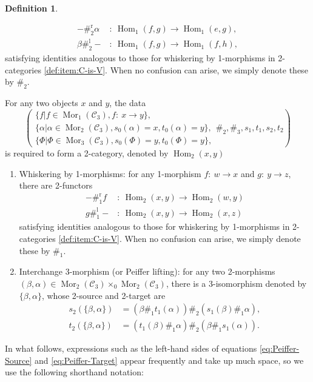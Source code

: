 \documentclass[11pt, reqno]{amsart} %
\newcommand{\mor}{{\mathop{\mathrm{Mor}}}}
\newcommand{\Hom}{{\mathop{\mathrm{Hom}}}}
\newcommand{\cC}{{\mathcal{C}}}
\theoremstyle{definition}
\newtheorem{definition}[theorem]{Definition}
\theoremstyle{remark}
\numberwithin{equation}{section}
\begin{document}
\begin{definition}
\begin{enumerate}
\begin{align}
    -\#_2^{\text{r}}\alpha&:~\Hom_1(f,g)\to \Hom_1(e,g), \\ 
    \nonumber
    \beta\#_2^{\text{l}}-&:~\Hom_1(f,g)\to \Hom_1(f,h),
  \end{align}
  satisfying identities analogous to those for whiskering by 1-morphisms in 2-categories \ref{def:item:C-is-V}.
  When no confusion can arise, we simply denote these by $\#_2$. 
\end{enumerate}
For any two objects $x$ and $y$, the data 
\[
  \left(
    \begin{array}{l}
      \{f|f\in\mor_1(\cC_3),f:~x\to y\}, \\
      \{\alpha|\alpha\in\mor_2(\cC_3),s_0(\alpha) = x,t_0(\alpha) = y\}, \\
      \{\Phi|\Phi\in\mor_3(\cC_3),s_0(\Phi) = y,t_0(\Phi) = y\},
    \end{array}
  \#_2,\#_3,s_1,t_1,s_2,t_2\right)
\]
is required to form a 2-category, denoted by $\Hom_2(x,y)$
\begin{enumerate}
  \setcounter{enumi}{\thetemp}
  \item Whiskering by 1-morphisms: for any 1-morphism $f:~w\to x$ and $g:~y\to z$, there are 2-functors 
  \begin{align}
    \nonumber
    -\#_1^{\text{r}}f&:~\Hom_2(x,y)\to \Hom_2(w,y) \\
    \nonumber
    g\#_1^{\text{l}}-&:~ \Hom_2(x,y)\to \Hom_2(x,z)
  \end{align}
  satisfying identities analogous to those for whiskering by 1-morphisms in 2-categories \ref{def:item:C-is-V}. When no confusion can arise, we simply denote these by $\#_1$. 
  \item Interchange 3-morphism (or Peiffer lifting): for any two 2-morphisms $(\beta,\alpha)\in\mor_2(\cC_3)\times_0\mor_2(\cC_3)$, there is a 3-isomorphism denoted by $\{\beta,\alpha\}$, whose 2-source and 2-target are
  \begin{align}
    \label{eq:Peiffer-Source}
    s_2(\{\beta,\alpha\}) &= (\beta\#_1t_1(\alpha))\#_2(s_1(\beta)\#_1\alpha), \\
    \label{eq:Peiffer-Target}
    t_2(\{\beta,\alpha\}) &= (t_1(\beta)\#_1\alpha)\#_2(\beta\#_1s_1(\alpha)).
  \end{align}
\end{enumerate}
In what follows, expressions such as the left-hand sides of equations \eqref{eq:Peiffer-Source} and \eqref{eq:Peiffer-Target} appear frequently and take up much space, so we use the following shorthand notation:

\end{definition}
\end{document}
